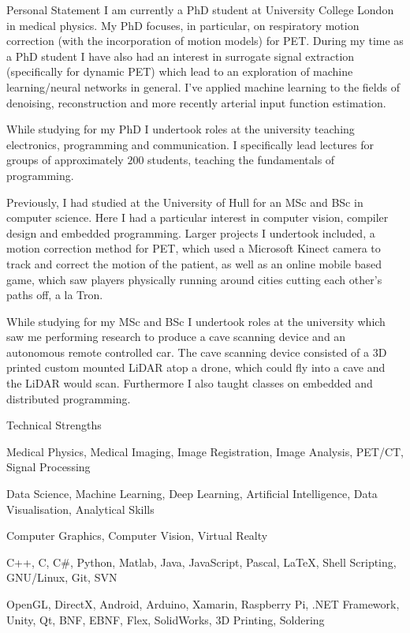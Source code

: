 \documentclass{cv}
\begin{document}
    \begin{rSection}{Personal Statement}
        I am currently a PhD student at University College London in medical physics. My PhD focuses, in particular, on respiratory motion correction (with the incorporation of motion models) for PET. During my time as a PhD student I have also had an interest in surrogate signal extraction (specifically for dynamic PET) which lead to an exploration of machine learning/neural networks in general. I've applied machine learning to the fields of denoising, reconstruction and more recently arterial input function estimation.
        
        While studying for my PhD I undertook roles at the university teaching electronics, programming and communication. I specifically lead lectures for groups of approximately $200$ students, teaching the fundamentals of programming.
        
        Previously, I had studied at the University of Hull for an MSc and BSc in computer science. Here I had a particular interest in computer vision, compiler design and embedded programming. Larger projects I undertook included, a motion correction method for PET, which used a Microsoft Kinect camera to track and correct the motion of the patient, as well as an online mobile based game, which saw players physically running around cities cutting each other's paths off, a la Tron.
        
        While studying for my MSc and BSc I undertook roles at the university which saw me performing research to produce a cave scanning device and an autonomous remote controlled car. The cave scanning device consisted of a 3D printed custom mounted LiDAR atop a drone, which could fly into a cave and the LiDAR would scan. Furthermore I also taught classes on embedded and distributed programming.
    \end{rSection}
    
    \begin{rSection}{Technical Strengths}
        \item Medical Physics, Medical Imaging, Image Registration, Image Analysis, PET/CT, Signal Processing
        \item Data Science, Machine Learning, Deep Learning, Artificial Intelligence, Data Visualisation, Analytical Skills
        \item Computer Graphics, Computer Vision, Virtual Realty
        \item C++, C, C\#, Python, Matlab, Java, JavaScript, Pascal, LaTeX, Shell Scripting, GNU/Linux, Git, SVN
        \item OpenGL, DirectX, Android, Arduino, Xamarin, Raspberry Pi, .NET Framework, Unity, Qt, BNF, EBNF, Flex, SolidWorks, 3D Printing, Soldering 
    \end{rSection}
    
\end{document}
